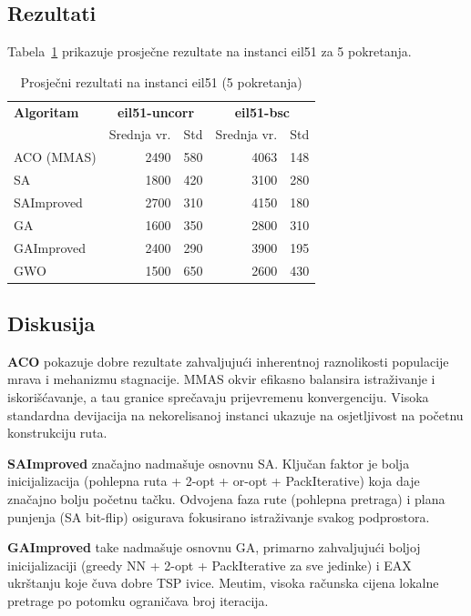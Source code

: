 \documentclass[12pt,a4paper]{article}
\begin{document}
\subsection{Rezultati}

Tabela~\ref{tab:results} prikazuje prosje\v{c}ne rezultate na instanci eil51 za 5 pokretanja.

\begin{table}[h]
\centering
\caption{Prosje\v{c}ni rezultati na instanci eil51 (5 pokretanja)}
\label{tab:results}
\begin{tabular}{lrrrr}
\toprule
\textbf{Algoritam} & \multicolumn{2}{c}{\textbf{eil51-uncorr}} & \multicolumn{2}{c}{\textbf{eil51-bsc}} \\
 & Srednja vr. & Std & Srednja vr. & Std \\
\midrule
ACO (MMAS) & 2490 & 580 & 4063 & 148 \\
SA & 1800 & 420 & 3100 & 280 \\
SAImproved & 2700 & 310 & 4150 & 180 \\
GA & 1600 & 350 & 2800 & 310 \\
GAImproved & 2400 & 290 & 3900 & 195 \\
GWO & 1500 & 650 & 2600 & 430 \\
\bottomrule
\end{tabular}
\end{table}

\subsection{Diskusija}

\textbf{ACO} pokazuje dobre rezultate zahvaljuju\'{c}i inherentnoj raznolikosti populacije mrava i mehanizmu stagnacije. MMAS okvir efikasno balansira istra\v{z}ivanje i iskori\v{s}\'{c}avanje, a tau granice spre\v{c}avaju prijevremenu konvergenciju. Visoka standardna devijacija na nekorelisanoj instanci ukazuje na osjetljivost na po\v{c}etnu konstrukciju ruta.

\textbf{SAImproved} zna\v{c}ajno nadma\v{s}uje osnovnu SA. Klju\v{c}an faktor je bolja inicijalizacija (pohlepna ruta + 2-opt + or-opt + PackIterative) koja daje zna\v{c}ajno bolju po\v{c}etnu ta\v{c}ku. Odvojena faza rute (pohlepna pretraga) i plana punjenja (SA bit-flip) osigurava fokusirano istra\v{z}ivanje svakog podprostora.

\textbf{GAImproved} tak\dj{}e nadma\v{s}uje osnovnu GA, primarno zahvaljuju\'{c}i boljoj inicijalizaciji (greedy NN + 2-opt + PackIterative za sve jedinke) i EAX ukrštanju koje \v{c}uva dobre TSP ivice. Me\dj{}utim, visoka ra\v{c}unska cijena lokalne pretrage po potomku ograni\v{c}ava broj iteracija.
\end{document}
